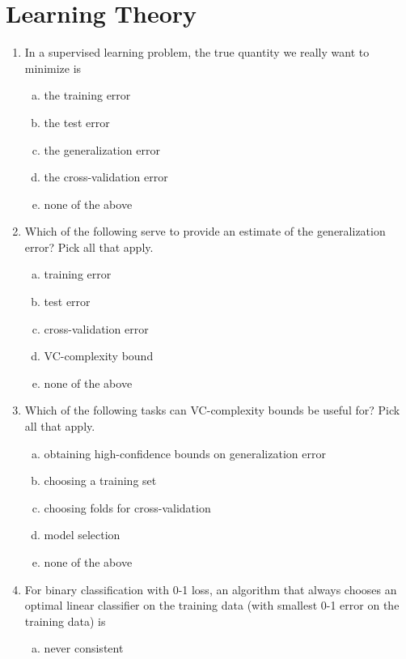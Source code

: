 \section{ Learning Theory}

\begin{enumerate}[1.]
\item
In a supervised learning problem, the true quantity we really want to minimize is
\begin{enumerate}[(a)]
\item the training error
\item the test error
\item the generalization error
\item the cross-validation error
\item none of the above
\end{enumerate}
%
\vspace{4pt}
%
\item
Which of the following serve to provide an estimate of the generalization error? Pick all that apply.
\begin{enumerate}[(a)]
\item training error
\item test error
\item cross-validation error
\item VC-complexity bound
\item none of the above
\end{enumerate}
%
\vspace{4pt}
%
\item
Which of the following tasks can VC-complexity bounds be useful for? Pick all that apply.
\begin{enumerate}[(a)]
\item obtaining high-confidence bounds on generalization error
\item choosing a training set
\item choosing folds for cross-validation
\item model selection
\item none of the above
\end{enumerate}
%
\vspace{4pt}
%
\item
For binary classification with 0-1 loss, an algorithm that always chooses an optimal linear classifier on the training data (with smallest 0-1 error on the training data) is
\begin{enumerate}[(a)]
\item never consistent

\end{enumerate}
\end{enumerate}
